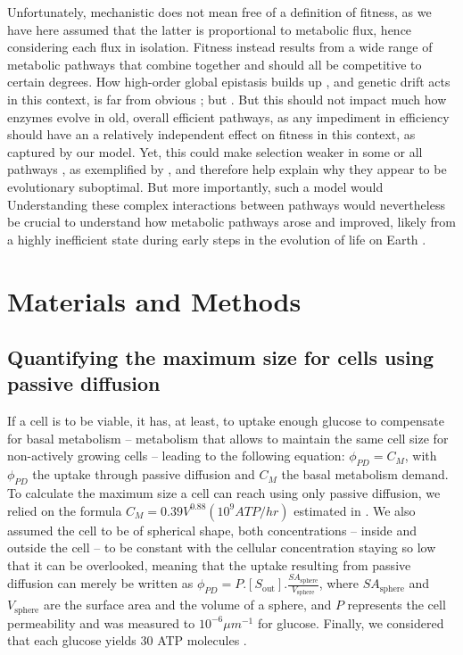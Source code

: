 \documentclass[11pt,onecolumn]{article}
\providecommand{\DIFadd}[1]{{\protect\color{blue} \sf #1}} %
\providecommand{\DIFdel}[1]{{\protect\color{red} \scriptsize #1}} %
\providecommand{\DIFaddbegin}{} %
\providecommand{\DIFaddend}{} %
\providecommand{\DIFdelbegin}{} %
\providecommand{\DIFdelend}{} %
\begin{document}
\DIFaddend Unfortunately, mechanistic does not mean free of a definition of fitness, as we have \DIFaddbegin \DIFadd{here }\DIFaddend assumed that the latter is proportional to metabolic flux, hence considering each flux in isolation. Fitness instead results from a wide range of metabolic pathways that combine together and should all be competitive to certain degrees. How \DIFdelbegin \DIFdel{high-order }\DIFdelend \DIFaddbegin \DIFadd{global }\DIFaddend epistasis builds up \DIFaddbegin \DIFadd{\citep{Weinreich13,Otwinowski18,Reddy20}}\DIFaddend , and genetic drift acts in this context, is far from obvious \DIFdelbegin \DIFdel{; but }\DIFdelend \DIFaddbegin \DIFadd{\citep{Iwasa04,Weinreich05,Weissman09}. But }\DIFaddend this should not impact much how enzymes evolve in old, overall efficient pathways, as any impediment in efficiency should have \DIFdelbegin \DIFdel{an }\DIFdelend \DIFaddbegin \DIFadd{a relatively }\DIFaddend independent effect on fitness in this context, as captured by our model. \DIFdelbegin \DIFdel{Yet, this could make selection weaker in some or all pathways , as exemplified by \citet{Heckmann18}, and therefore help explain why they appear to be evolutionary suboptimal. But more importantly, such a model would }\DIFdelend \DIFaddbegin \DIFadd{Understanding these complex interactions between pathways would nevertheless }\DIFaddend be crucial to understand how metabolic pathways arose and improved, likely from a highly inefficient state during early steps in the evolution of life on Earth \DIFaddbegin \DIFadd{\citep{Kacser84,Schmidt03,Heckmann18}}\DIFaddend .

\section{Materials and Methods\label{sec:M&M}}

\subsection{Quantifying the maximum size for cells using passive diffusion}

If a cell is to be viable, it has, at least, to uptake enough glucose to compensate for basal metabolism -- metabolism that allows to maintain the same cell size for non-actively growing cells \citep{Lynch15} -- leading to the following equation: $\phi_{PD}=C_M$, with $\phi_{PD}$ the uptake through passive diffusion and $C_M$ the basal metabolism demand. To calculate the maximum size a cell can reach using only passive diffusion, we relied on the formula $C_M=0.39V^{0.88} (10^9 ATP/hr)$ estimated in \citep{Lynch15}. We also assumed the cell to be of spherical shape, both concentrations -- inside and outside the cell -- to be constant with the cellular concentration staying so low that it can be overlooked, meaning that the uptake resulting from passive diffusion can merely be written as $\phi_{PD}=P.[S_{\text{out}}].\frac{SA_{\text{sphere}}}{V_{\text{sphere}}}$, where $SA_{\text{sphere}}$ and $V_{\text{sphere}}$ are the surface area and the volume of a sphere, and $P$ represents the cell permeability and was measured to $10^{-6}\mu m^{-1}$ \citep{Wood68} for glucose. Finally, we considered that each glucose yields 30 ATP molecules \citep{Rich03}. 
\end{document}

